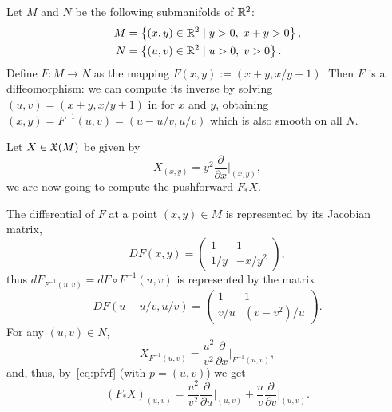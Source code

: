 \begin{example}
  Let $M$ and $N$ be the following submanifolds of $\mathbb{R}^2$:
  \begin{align}
    M & = \left\{(x,y)\in\mathbb{R}^2 \mid y>0,\; x+y>0\right\}, \\
    N & = \left\{(u,v)\in\mathbb{R}^2 \mid u>0,\; v>0 \right\}.
  \end{align}
  Define $F:M\to N$ as the mapping $F(x,y):=(x+y, x/y+1)$.
  Then $F$ is a diffeomorphism: we can compute its inverse by solving $(u,v)=(x+y, x/y+1)$ in for $x$ and $y$, obtaining $(x,y)=F^{-1}(u,v)=(u-u/v, u/v)$ which is also smooth on all $N$.

  Let $X\in\mathfrak{X}(M)$ be given by
  \begin{equation}
    X_{(x,y)} = y^2\frac{\partial}{\partial x}\Big|_{(x,y)},
  \end{equation}
  we are now going to compute the pushforward $F_* X$.

  The differential of $F$ at a point $(x,y)\in M$ is represented by its Jacobian matrix,
  \begin{equation}
    DF(x,y) = \begin{pmatrix}
      1   & 1      \\
      1/y & -x/y^2
    \end{pmatrix},
  \end{equation}
  thus $dF_{F^{-1}(u,v)} = dF\circ F^{-1}(u,v)$ is represented by the matrix
  \begin{equation}
    DF(u-u/v, u/v) = \begin{pmatrix}
      1   & 1         \\
      v/u & (v-v^2)/u
    \end{pmatrix}.
  \end{equation}
  For any $(u,v)\in N$,
  \begin{equation}
    X_{F^{-1}(u,v)} = \frac{u^2}{v^2}\frac{\partial}{\partial x}\Big|_{F^{-1}(u,v)},
  \end{equation}
  and, thus, by~\eqref{eq:pfvf} (with $p=(u,v)$) we get
  \begin{equation}
    (F_*X)_{(u,v)} = \frac{u^2}{v^2}\frac{\partial}{\partial u}\Big|_{(u,v)} + \frac{u}{v}\frac{\partial}{\partial v}\Big|_{(u,v)}.
  \end{equation}
\end{example}

